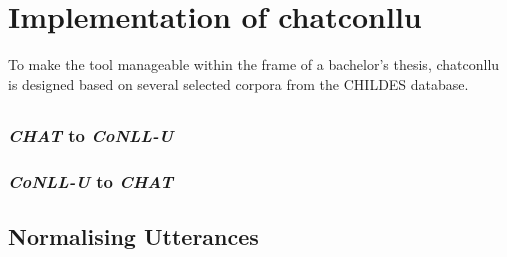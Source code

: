 \chapter{Implementation of chatconllu} %

\label{Chapter3} %

To make the tool manageable within the frame of a bachelor's thesis, chatconllu is designed based on several selected corpora from the CHILDES database.
\section{}
\subsection{\emph{CHAT} to \emph{CoNLL-U}}
\subsection{\emph{CoNLL-U} to \emph{CHAT}}



%

\section{Normalising Utterances}
